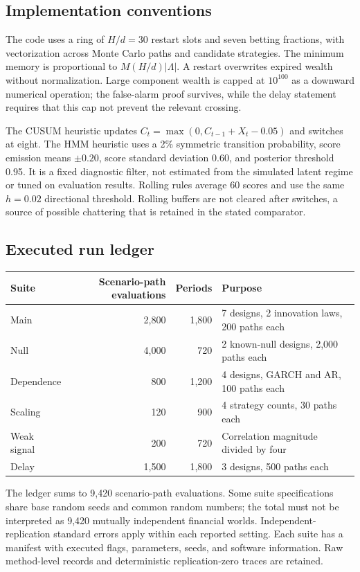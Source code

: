 \subsection{Implementation conventions}
The code uses a ring of $H/d=30$ restart slots and seven betting fractions, with vectorization across Monte Carlo paths and candidate strategies. The minimum memory is proportional to $M(H/d)|\Lambda|$. A restart overwrites expired wealth without normalization. Large component wealth is capped at $10^{100}$ as a downward numerical operation; the false-alarm proof survives, while the delay statement requires that this cap not prevent the relevant crossing.

The CUSUM heuristic updates $C_t=\max(0,C_{t-1}+X_t-0.05)$ and switches at eight. The HMM heuristic uses a 2\% symmetric transition probability, score emission means $\pm0.20$, score standard deviation $0.60$, and posterior threshold 0.95. It is a fixed diagnostic filter, not estimated from the simulated latent regime or tuned on evaluation results. Rolling rules average 60 scores and use the same $h=0.02$ directional threshold. Rolling buffers are not cleared after switches, a source of possible chattering that is retained in the stated comparator.

\subsection{Executed run ledger}
\begin{center}\small
\begin{tabular}{lrrl}
\toprule Suite & Scenario-path evaluations & Periods & Purpose \\\midrule
Main & 2,800 & 1,800 & 7 designs, 2 innovation laws, 200 paths each \\
Null & 4,000 & 720 & 2 known-null designs, 2,000 paths each \\
Dependence & 800 & 1,200 & 4 designs, GARCH and AR, 100 paths each \\
Scaling & 120 & 900 & 4 strategy counts, 30 paths each \\
Weak signal & 200 & 720 & Correlation magnitude divided by four \\
Delay & 1,500 & 1,800 & 3 designs, 500 paths each \\\bottomrule
\end{tabular}
\end{center}
The ledger sums to 9,420 scenario-path evaluations. Some suite specifications share base random seeds and common random numbers; the total must not be interpreted as 9,420 mutually independent financial worlds. Independent-replication standard errors apply within each reported setting. Each suite has a manifest with executed flags, parameters, seeds, and software information. Raw method-level records and deterministic replication-zero traces are retained.

